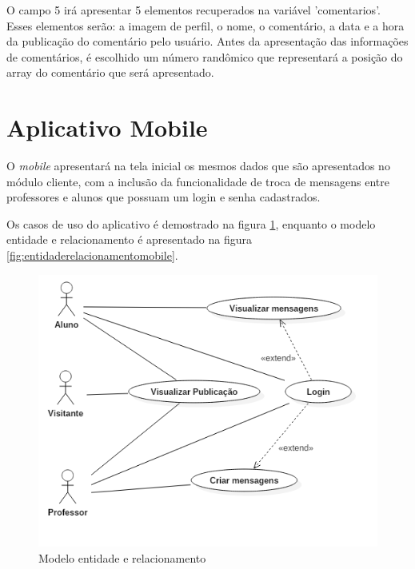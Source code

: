 O campo 5 irá apresentar 5 elementos recuperados na variável 'comentarios'. Esses elementos serão: a imagem de perfil, o nome, o comentário, a data e a hora da publicação do comentário pelo usuário. Antes da apresentação das informações de comentários, é escolhido um número randômico que representará a posição do array do comentário que será apresentado.

\section{Aplicativo Mobile}
O \textit{mobile} apresentará na tela inicial os mesmos dados que são apresentados no módulo cliente, com a inclusão da funcionalidade de troca de mensagens entre professores e alunos que possuam um login e senha cadastrados.

Os casos de uso do aplicativo é demostrado na figura \ref{fig:casosdeusomobile}, enquanto o modelo entidade e relacionamento é apresentado na figura \ref{fig:entidaderelacionamentomobile}.
\begin{figure}[H]
\centering
\includegraphics[scale=0.4]{figuras/CasosDeUsoMobile}
\caption{Modelo entidade e relacionamento}
\label{fig:casosdeusomobile}
\end{figure}


